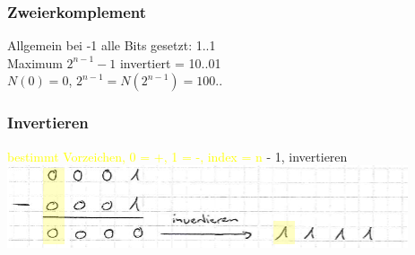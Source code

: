 \subsubsection{Zweierkomplement}
Allgemein bei -1 alle Bits gesetzt: 1..1\\
Maximum $2^{n-1}-1$ invertiert = 10..01\\
$N(0) = 0$, $2^{n-1} = N(2^{n-1}) = 100..$

\subsubsection{Invertieren}
\textcolor{yellow}{bestimmt Vorzeichen, 0 = +, 1 = -, index = n}
- 1, invertieren\\
\includegraphics[scale = .5]{grafiken/zweierkomplement3.PNG}